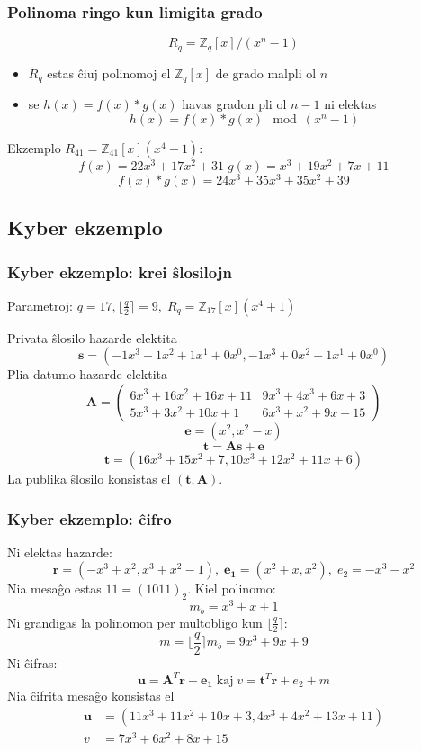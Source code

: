 \documentclass[utf8, aspectratio=169]{beamer}
\begin{document}
\begin{frame}
  \frametitle{Polinoma ringo kun limigita grado}
  \[
    R_q = \mathbb{Z}_q[x]/(x^n-1)
  \]

  \begin{itemize}
  \item<+-> $R_q$ estas ĉiuj polinomoj el $\mathbb{Z}_q[x]$ de grado malpli ol $n$
  \item<+-> se $h(x) = f(x) * g(x)$ havas gradon pli ol $n-1$ ni elektas
    \[h(x) = f(x) * g(x) \mod (x^n-1)\]
  \end{itemize}

  \pause
  \vspace{0.5em}
  Ekzemplo $R_{41} = \mathbb{Z}_{41}[x](x^4-1)$:
  \[
    f(x) = 22x^3 + 17x^2 + 31 \; g(x) = x^3 + 19x^2 + 7x + 11
  \]
  \[
    f(x) * g(x) = 24x^3 + 35x^3 + 35x^2 + 39
  \]
\end{frame}

\subsection*{Kyber ekzemplo}

\begin{frame}
  \frametitle{Kyber ekzemplo: krei ŝlosilojn}
  Parametroj: $q = 17, \lfloor \frac{q}{2} \rceil = 9, \; R_q = \mathbb{Z}_{17}[x](x^4 + 1)$\par
  \pause
  \vspace{0.5em}
  Privata ŝlosilo hazarde elektita
  \[ \mathbf{s} = \left( - 1x^3 - 1x^2 + 1x^1 + 0x^0, - 1x^3 +0x^2 - 1x^1 + 0x^0 \right) \]
  \pause
  Plia datumo hazarde elektita
  \[
    \mathbf{A} =
    \begin{pmatrix}
      6x^3 + 16x^2 + 16x + 11 & 9x^3 + 4x^3 + 6x + 3 \\
      5x^3 + 3x^2 + 10x +1    & 6x^3 + x^2 + 9x + 15
    \end{pmatrix}
  \]
  \[
    \mathbf{e} = \left( x^2, x^2 - x \right)
  \]
  \[
    \mathbf{t} = \mathbf{A}\mathbf{s} + \mathbf{e}
  \]
  \[
    \mathbf{t} = \left( 16x^3 + 15x^2 + 7, 10x^3 + 12x^2 + 11x + 6 \right)
  \]
  \pause
  La publika ŝlosilo konsistas el $(\mathbf{t}, \mathbf{A})$.
\end{frame}

\begin{frame}
  \frametitle{Kyber ekzemplo: ĉifro}
  Ni elektas hazarde:
  \[
    \mathbf{r} = \left( -x^3 + x^2, x^3 + x^2 - 1 \right), \; \mathbf{e_1} = \left( x^2 + x, x^2 \right), \; e_2 = -x^3 - x^2
  \]
  \pause
  Nia mesaĝo estas $11 = (1011)_2$. Kiel polinomo:
  \[m_b = x^3 + x + 1\]
  \pause
  Ni grandigas la polinomon per multobligo kun $\lfloor \frac{q}{2} \rceil$:
  \[m = \lfloor \frac{q}{2} \rceil m_b = 9x^3 + 9x + 9\]
  \pause
  Ni ĉifras:
  \[
    \mathbf{u} = \mathbf{A}^T\mathbf{r} + \mathbf{e_1} \;\text{kaj}\; v = \mathbf{t}^T\mathbf{r} + e_2 + m
  \]
  \pause
  Nia ĉifrita mesaĝo konsistas el
  \[
    \begin{split}
      \mathbf{u} & = (11x^3 + 11x^2 + 10x + 3, 4x^3 + 4x^2 + 13x + 11) \\
      v & = 7x^3 + 6x^2 + 8x + 15
    \end{split}
  \]
\end{frame}
\end{document}
